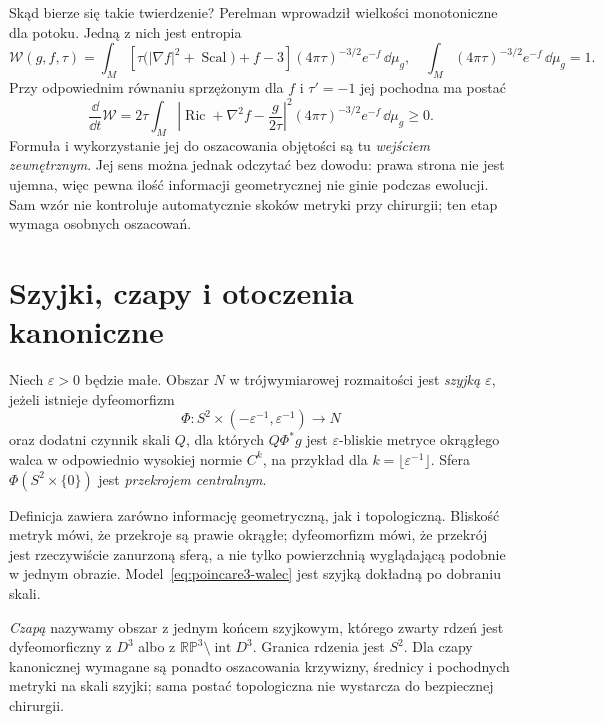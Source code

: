 Skąd bierze się takie twierdzenie? Perelman
wprowadził wielkości monotoniczne dla potoku.
Jedną z nich jest entropia
\[
 \mathcal W(g,f,\tau)=
 \int_M\left[\tau\bigl(|\nabla f|^2
                  +\operatorname{Scal}\bigr)+f-3\right]
 (4\pi\tau)^{-3/2}e^{-f}\,\dd\mu_g,
 \quad
 \int_M(4\pi\tau)^{-3/2}e^{-f}\,\dd\mu_g=1.
\]
Przy odpowiednim równaniu sprzężonym dla $f$
i $\tau'=-1$ jej pochodna ma postać
\begin{equation}\label{eq:poincare3-entropy}
 \frac{\dd}{\dd t}\mathcal W
 =2\tau\int_M
 \left|\operatorname{Ric}+\nabla^2f
              -\frac{g}{2\tau}\right|^2
 (4\pi\tau)^{-3/2}e^{-f}\,\dd\mu_g\geq0.
\end{equation}
Formuła i wykorzystanie jej do oszacowania objętości
są tu \emph{wejściem zewnętrznym}. Jej sens można
jednak odczytać bez dowodu: prawa strona nie jest
ujemna, więc pewna ilość informacji geometrycznej
nie ginie podczas ewolucji. Sam wzór nie kontroluje
automatycznie skoków metryki przy chirurgii;
ten etap wymaga osobnych oszacowań.

\section{Szyjki, czapy i otoczenia kanoniczne}
\label{sec:poincare3-kanoniczne}

\begin{definicja}
\label{def:poincare3-neck}
Niech $\varepsilon>0$ będzie małe. Obszar $N$
w trójwymiarowej rozmaitości jest
\emph{szyjką $\varepsilon$}, jeżeli istnieje
dyfeomorfizm
\[
 \Phi:S^2\times(-\varepsilon^{-1},
                       \varepsilon^{-1})\longrightarrow N
\]
oraz dodatni czynnik skali $Q$, dla których
$Q\Phi^*g$ jest $\varepsilon$-bliskie metryce
okrągłego walca w odpowiednio wysokiej normie
$C^k$, na przykład dla
$k=\lfloor\varepsilon^{-1}\rfloor$.
Sfera $\Phi(S^2\times\{0\})$ jest
\emph{przekrojem centralnym}.
\end{definicja}

Definicja zawiera zarówno informację geometryczną,
jak i topologiczną. Bliskość metryk mówi, że
przekroje są prawie okrągłe; dyfeomorfizm mówi,
że przekrój jest rzeczywiście zanurzoną sferą,
a nie tylko powierzchnią wyglądającą podobnie
w jednym obrazie. Model~\eqref{eq:poincare3-walec}
jest szyjką dokładną po dobraniu skali.

\begin{definicja}
\label{def:poincare3-cap}
\emph{Czapą} nazywamy obszar z jednym końcem
szyjkowym, którego zwarty rdzeń jest dyfeomorficzny
z $D^3$ albo z $\mathbb{RP}^3\setminus
\operatorname{int}D^3$. Granica rdzenia jest
$S^2$. Dla czapy kanonicznej wymagane są ponadto
oszacowania krzywizny, średnicy i pochodnych
metryki na skali szyjki; sama postać topologiczna
nie wystarcza do bezpiecznej chirurgii.
\end{definicja}

